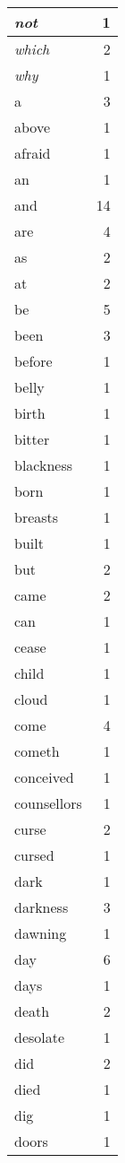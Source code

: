 \begin{center}
\begin{longtable}{l|r}
\emph{not} & 1\\ \hline 
\emph{which} & 2\\ \hline 
\emph{why} & 1\\ \hline 
a & 3\\ \hline 
above & 1\\ \hline 
afraid & 1\\ \hline 
an & 1\\ \hline 
and & 14\\ \hline 
are & 4\\ \hline 
as & 2\\ \hline 
at & 2\\ \hline 
be & 5\\ \hline 
been & 3\\ \hline 
before & 1\\ \hline 
belly & 1\\ \hline 
birth & 1\\ \hline 
bitter & 1\\ \hline 
blackness & 1\\ \hline 
born & 1\\ \hline 
breasts & 1\\ \hline 
built & 1\\ \hline 
but & 2\\ \hline 
came & 2\\ \hline 
can & 1\\ \hline 
cease & 1\\ \hline 
child & 1\\ \hline 
cloud & 1\\ \hline 
come & 4\\ \hline 
cometh & 1\\ \hline 
conceived & 1\\ \hline 
counsellors & 1\\ \hline 
curse & 2\\ \hline 
cursed & 1\\ \hline 
dark & 1\\ \hline 
darkness & 3\\ \hline 
dawning & 1\\ \hline 
day & 6\\ \hline 
days & 1\\ \hline 
death & 2\\ \hline 
desolate & 1\\ \hline 
did & 2\\ \hline 
died & 1\\ \hline 
dig & 1\\ \hline 
doors & 1\\ \hline 

\end{longtable}
\end{center}
